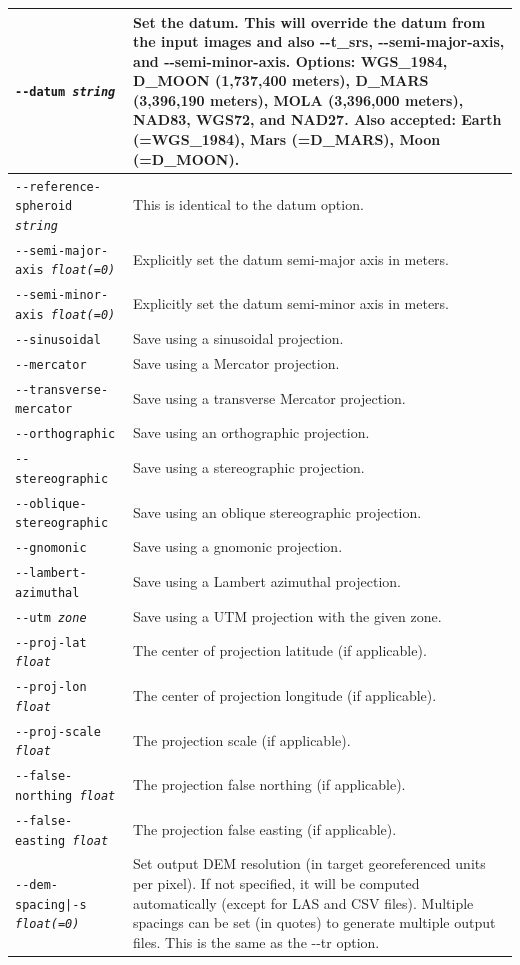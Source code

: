 \begin{longtable}{|p{8cm}|p{9cm}|}
\texttt{-\/-datum \textit{string}} & Set the datum. This will override the datum from the input images and also -\/-t\_srs, -\/-semi-major-axis, and -\/-semi-minor-axis. Options: WGS\_1984, D\_MOON (1,737,400 meters), D\_MARS (3,396,190 meters), MOLA (3,396,000 meters), NAD83, WGS72, and NAD27. Also accepted: Earth (=WGS\_1984), Mars (=D\_MARS), Moon (=D\_MOON). \\ \hline
\texttt{-\/-reference-spheroid \textit{string}} & This is identical to the datum option. \\ \hline
\texttt{-\/-semi-major-axis \textit{float(=0)}} & Explicitly set the datum semi-major axis in meters.\\ \hline
\texttt{-\/-semi-minor-axis \textit{float(=0)}} & Explicitly set the datum semi-minor axis in meters.\\ \hline
\texttt{-\/-sinusoidal} & Save using a sinusoidal projection. \\ \hline
\texttt{-\/-mercator} & Save using a Mercator projection. \\ \hline
\texttt{-\/-transverse-mercator} & Save using a transverse Mercator projection. \\ \hline
\texttt{-\/-orthographic} & Save using an orthographic projection. \\ \hline
\texttt{-\/-stereographic} & Save using a stereographic projection. \\ \hline
\texttt{-\/-oblique-stereographic} & Save using an oblique stereographic projection. \\ \hline
\texttt{-\/-gnomonic} & Save using a gnomonic projection. \\ \hline
\texttt{-\/-lambert-azimuthal} & Save using a Lambert azimuthal projection. \\ \hline
\texttt{-\/-utm \textit{zone}} & Save using a UTM projection with the given zone. \\ \hline
\texttt{-\/-proj-lat \textit{float}} & The center of projection latitude (if applicable). \\ \hline
\texttt{-\/-proj-lon \textit{float}} & The center of projection longitude (if applicable). \\ \hline
\texttt{-\/-proj-scale \textit{float}} & The projection scale (if applicable). \\ \hline
\texttt{-\/-false-northing \textit{float}} & The projection false northing (if applicable). \\ \hline
\texttt{-\/-false-easting \textit{float}} & The projection false easting (if applicable). \\ \hline
\texttt{-\/-dem-spacing|-s \textit{float(=0)}} & Set output DEM resolution (in target georeferenced units per pixel). If not specified, it will be computed automatically (except for LAS and CSV files). Multiple spacings can be set (in quotes) to generate multiple output files. This is the same as the -\/-tr option. \\ \hline


\end{longtable}
